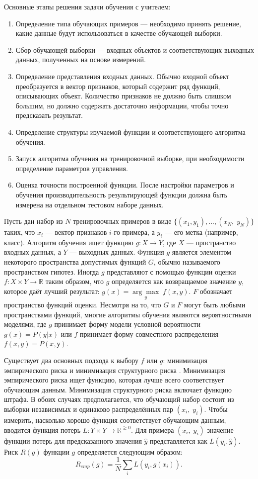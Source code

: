 Основные этапы решения задачи обучения с учителем:
\begin{enumerate}
	\item Определение типа обучающих примеров --- необходимо принять решение, какие данные будут использоваться в качестве обучающей выборки. 
	\item Сбор обучающей выборки --- входных объектов и соответствующих выходных данных, полученных на основе измерений.
	\item Определение представления входных данных. Обычно входной объект преобразуется в вектор признаков, который содержит ряд функций, описывающих объект. Количество признаков не должно быть слишком большим, но должно содержать достаточно информации, чтобы точно предсказать результат.
	\item Определение структуры изучаемой функции и соответствующего алгоритма обучения. 
	\item Запуск алгоритма обучения на тренировочной выборке, при необходимости определение параметров управления. 
	\item Оценка точности построенной функции. После настройки параметров и обучения производительность результирующей функции должна быть измерена на отдельном тестовом наборе данных.
\end{enumerate}

Пусть дан набор из $N$ тренировочных примеров в виде $\{(x_1, y_1), ..., (x_N,\; y_N)\}$ таких, что $x_{i}$ --- вектор признаков $i$-го примера, а $y_{i}$ --- его метка (например, класс). Алгоритм обучения ищет функцию $g: X \to Y$, где $X$ --- пространство входных данных, а $Y$ --- выходных данных. Функция $g$ является элементом некоторого пространства допустимых функций $G$, обычно называемого пространством гипотез. Иногда $g$ представляют с помощью функции оценки $f: X \times Y \to \mathbb{R}$ таким образом, что $g$ определяется как возвращаемое значение $y$, которое даёт лучший результат: $g(x) = {\underset{y} {\arg\max}}\; f(x, y)$. $F$ обозначает пространство функций оценки. Несмотря на то, что $G$ и $F$ могут быть любыми пространствами функций, многие алгоритмы обучения являются вероятностными моделями, где $g$ принимает форму модели условной вероятности $g(x) = P(y|x)$ или $f$ принимает форму совместного распределения $f(x, y) = P(x, у)$. 

Существует два основных подхода к выбору $f$ или $g$: минимизация эмпирического риска и минимизация структурного риска \autocite{vapnik2013nature}. Минимизация эмпирического риска ищет функцию, которая лучше всего соответствует обучающим данным. Минимизация структурного риска включает функцию штрафа. В обоих случаях предполагается, что обучающий набор состоит из выборки независимых и одинаково распределённых пар $(x_i, \; y_i)$. Чтобы измерить, насколько хорошо функция соответствует обучающим данным, вводится функция потерь $L: Y \times Y \to \mathbb {R}^{\geq 0}$. Для примера $(x_i, \; y_i)$ значение функции потерь для предсказанного значения $\hat{y}$ представляется как $L(y_i,\hat{y})$. Риск $R (g)$ функции $g$ определяется следующим образом:
\begin{equation}
\label{eq:sup_learn_loss}	
R_{emp} (g) = \frac{1}{N} \sum_i L(y_i, g(x_i)).
\end{equation}

